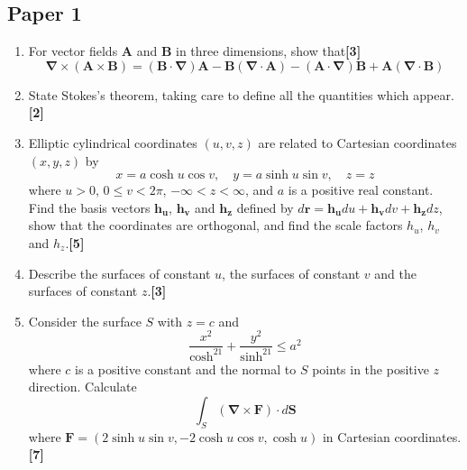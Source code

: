 \documentclass[a4paper]{article}
\begin{document}
\subsection{Paper 1}
\begin{qns}\leavevmode
\begin{enumerate}[label=(\alph*)]
    \item For vector fields $\mathbf{A}$ and $\mathbf{B}$ in three dimensions, show that\hfill\textbf{[3]}
$$\boldsymbol{\nabla}\times(\mathbf{A}\times\mathbf{B})=(\mathbf{B}\cdot\boldsymbol{\nabla})\mathbf{A}-\mathbf{B}(\boldsymbol{\nabla}\cdot\mathbf{A})-(\mathbf{A}\cdot\boldsymbol{\nabla})\mathbf{B}+\mathbf{A}(\boldsymbol{\nabla}\cdot\mathbf{B})$$
\item State Stokes’s theorem, taking care to define all the quantities which appear. \hfill\textbf{[2]}
\item Elliptic cylindrical coordinates $(u, v, z)$ are related to Cartesian coordinates $(x, y, z)$ by
$$x = a \cosh u \cos v,\quad y = a \sinh u \sin v,\quad z = z$$
where $u > 0$, $0\leq v<2\pi$, $-\infty<z<\infty$, and $a$ is a positive real constant. Find the basis vectors $\mathbf{h_u}$, $\mathbf{h_v}$ and $\mathbf{h_z}$ defined by $d\mathbf{r} = \mathbf{h_u} du + \mathbf{h_v} dv + \mathbf{h_z} dz$, show that the coordinates are orthogonal, and find the scale factors $h_u$, $h_v$ and $h_z$.\hfill\textbf{[5]}
\item Describe the surfaces of constant $u$, the surfaces of constant $v$ and the surfaces of constant $z$.\hfill\textbf{[3]}
\item Consider the surface $S$ with $z = c$ and
$$\frac{x^2}{\cosh^21}+\frac{y^2}{\sinh^21}\leq a^2$$
where $c$ is a positive constant and the normal to $S$ points in the positive $z$ direction. Calculate 
$$\int_S(\boldsymbol{\nabla}\times\mathbf{F})\cdot d\mathbf{S}$$
where $\mathbf{F} = (2 \sinh u \sin v,−2 \cosh u \cos v, \cosh u)$ in Cartesian coordinates. \hfill\textbf{[7]}
\end{enumerate}
\end{qns}
\end{document}
